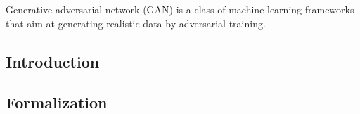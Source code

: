 
Generative adversarial network (GAN) is a class of machine learning frameworks that aim at generating realistic data by adversarial training.


\subsection{Introduction} 

\subsection{Formalization} 

